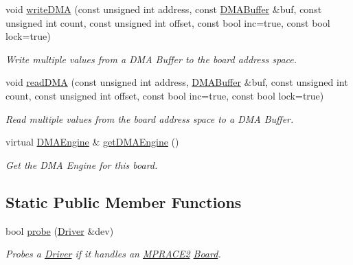 \begin{CompactItemize}
void \hyperlink{classmprace_1_1MPRACE2_a6}{write\-DMA} (const unsigned int address, const \hyperlink{classmprace_1_1DMABuffer}{DMABuffer} \&buf, const unsigned int count, const unsigned int offset, const bool inc=true, const bool lock=true)
\begin{CompactList}\small\item\em Write multiple values from a DMA Buffer to the board address space. \item\end{CompactList}\item 
void \hyperlink{classmprace_1_1MPRACE2_a7}{read\-DMA} (const unsigned int address, \hyperlink{classmprace_1_1DMABuffer}{DMABuffer} \&buf, const unsigned int count, const unsigned int offset, const bool inc=true, const bool lock=true)
\begin{CompactList}\small\item\em Read multiple values from the board address space to a DMA Buffer. \item\end{CompactList}\item 
virtual \hyperlink{classmprace_1_1DMAEngine}{DMAEngine} \& \hyperlink{classmprace_1_1MPRACE2_a8}{get\-DMAEngine} ()
\begin{CompactList}\small\item\em Get the DMA Engine for this board. \item\end{CompactList}\end{CompactItemize}
\subsection*{Static Public Member Functions}
\begin{CompactItemize}
\item 
bool \hyperlink{classmprace_1_1MPRACE2_e0}{probe} (\hyperlink{classmprace_1_1Driver}{Driver} \&dev)
\begin{CompactList}\small\item\em Probes a \hyperlink{classmprace_1_1Driver}{Driver} if it handles an \hyperlink{classmprace_1_1MPRACE2}{MPRACE2} \hyperlink{classmprace_1_1Board}{Board}. \item\end{CompactList}\end{CompactItemize}
